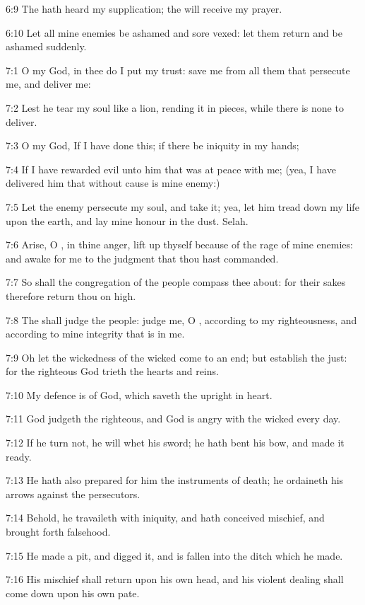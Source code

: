 6:9 The \LORD hath heard my supplication; the \LORD will receive my prayer.

6:10 Let all mine enemies be ashamed and sore vexed: let them return and be ashamed suddenly.



7:1 O \LORD my God, in thee do I put my trust: save me from all them that persecute me, and deliver me:

7:2 Lest he tear my soul like a lion, rending it in pieces, while there is none to deliver.

7:3 O \LORD my God, If I have done this; if there be iniquity in my hands;

7:4 If I have rewarded evil unto him that was at peace with me; (yea, I have delivered him that without cause is mine enemy:)

7:5 Let the enemy persecute my soul, and take it; yea, let him tread down my life upon the earth, and lay mine honour in the dust. Selah.

7:6 Arise, O \LORD, in thine anger, lift up thyself because of the rage of mine enemies: and awake for me to the judgment that thou hast commanded.

7:7 So shall the congregation of the people compass thee about: for their sakes therefore return thou on high.

7:8 The \LORD shall judge the people: judge me, O \LORD, according to my righteousness, and according to mine integrity that is in me.

7:9 Oh let the wickedness of the wicked come to an end; but establish the just: for the righteous God trieth the hearts and reins.

7:10 My defence is of God, which saveth the upright in heart.

7:11 God judgeth the righteous, and God is angry with the wicked every day.

7:12 If he turn not, he will whet his sword; he hath bent his bow, and made it ready.

7:13 He hath also prepared for him the instruments of death; he ordaineth his arrows against the persecutors.

7:14 Behold, he travaileth with iniquity, and hath conceived mischief, and brought forth falsehood.

7:15 He made a pit, and digged it, and is fallen into the ditch which he made.

7:16 His mischief shall return upon his own head, and his violent dealing shall come down upon his own pate.

